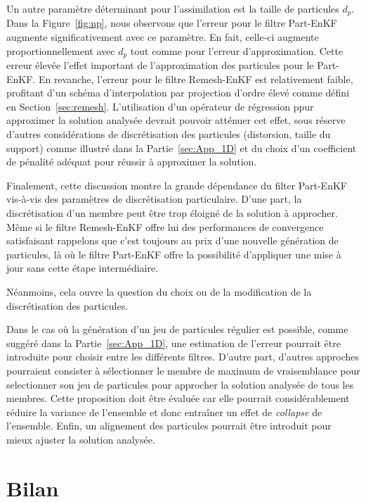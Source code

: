 Un autre paramètre déterminant pour l'assimilation est la taille de particules $d_p$. Dans la Figure~\ref{fig:np}, nous observons que l'erreur pour le filtre Part-EnKF augmente significativement avec ce paramètre. En fait, celle-ci augmente proportionnellement avec $d_p$ tout comme pour l'erreur d'approximation. Cette erreur élevée l'effet important de l'approximation des particules pour le Part-EnKF. En revanche, l'erreur pour le filtre Remesh-EnKF est relativement faible, profitant d'un schéma d'interpolation par projection d'ordre élevé comme défini en Section~\ref{sec:remesh}. L'utilisation d'un opérateur de régression ppur approximer la solution analysée devrait pouvoir atténuer cet effet, sous réserve d'autres considérations de discrétisation des particules (distorsion, taille du support) comme illustré dans la Partie~\ref{sec:App_1D} et du choix d'un coefficient de pénalité adéquat pour réussir à approximer la solution.

Finalement, cette discussion montre la grande dépendance du filter Part-EnKF vis-à-vis des paramètres de discrétisation particulaire. D'une part, la discrétisation d'un membre peut être trop éloigné de la solution à approcher.
Même si le filtre Remesh-EnKF offre lui des performances de convergence satisfaisant rappelons que c'est toujours au prix d'une nouvelle génération de particules, là où le filtre Part-EnKF offre la possibilité d'appliquer une mise à jour sans cette étape intermédiaire.

Néanmoins, cela ouvre la question du choix ou de la modification de la discrétisation des particules.

Dans le cas où la génération d'un jeu de particules régulier est possible, comme suggéré dans la Partie~\ref{sec:App_1D}, une estimation de l'erreur pourrait être introduite pour choisir entre les différents filtres. D'autre part, d'autres approches pourraient consister à sélectionner le membre de maximum de vraisemblance pour selectionner son jeu de particules pour approcher la solution analysée de tous les membres. Cette proposition doit être évaluée car elle pourrait considérablement réduire la variance de l'ensemble et donc entraîner un effet de \textit{collapse} de l'ensemble. Enfin, un alignement des particules pourrait être introduit pour mieux ajuster la solution analysée.

\section{Bilan}

